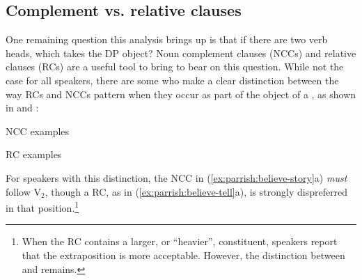 \documentclass[output=paper,newtxmath,modfonts,nonflat,draftmode]{langsci/langscibook}
\begin{document}
\subsection{Complement vs. relative clauses}
One remaining question this analysis brings up is that if there are two verb heads, which takes the DP object? Noun complement clauses (NCCs) and relative clauses (RCs) are a useful tool to bring to bear on this question. While not the case for all speakers, there are some who make a clear distinction between the way RCs and NCCs pattern when they occur as part of the object of a , as shown in  and :

 

\ea NCC examples

\z 
\label{ex:parrish:believe-story}
\z

\ea RC examples

\z 
\label{ex:parrish:believe-tell}
\z

For speakers with this distinction, the NCC in (\ref{ex:parrish:believe-story}a) \textit{must} follow V$_{2}$, though a RC, as in (\ref{ex:parrish:believe-tell}a), is strongly dispreferred in that position.\footnote{When the RC contains a larger, or ``heavier'', constituent, speakers report that the extraposition is more acceptable. However, the distinction between  and  remains.}
\end{document}
